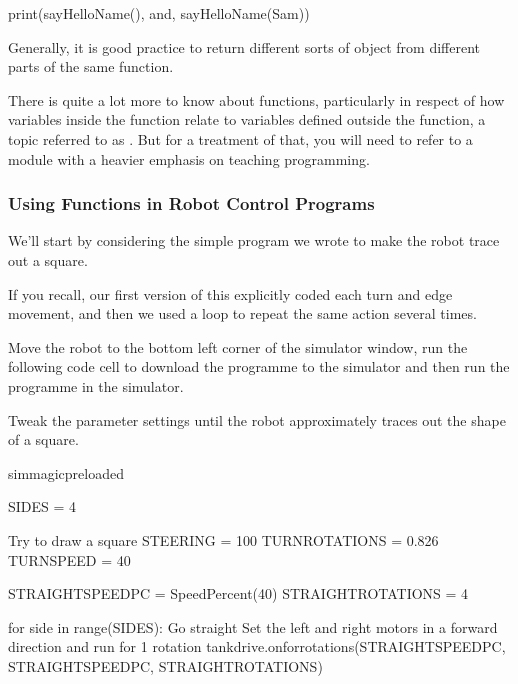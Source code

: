 \documentclass[letterpaper,10pt,english]{sphinxmanual}
\begin{document}
{{\begin{sphinxVerbatim}[commandchars=\\\{\}]
print(sayHelloName(), \PYGZsq{}and\PYGZsq{}, sayHelloName(\PYGZdq{}Sam\PYGZdq{}))
\end{sphinxVerbatim}
}

Generally, it is  good practice to return different sorts of object from different parts of the same function.

There is quite a lot more to know about functions, particularly in respect of how variables inside the function relate to variables defined outside the function, a topic referred to as . But for a treatment of that, you will need to refer to a module with a heavier emphasis on teaching programming.


\subsubsection{Using Functions in Robot Control Programs}
\label{\detokenize{content/03_Robot_Lab/Section_00_05:Using-Functions-in-Robot-Control-Programs}}
We’ll start by considering the simple program we wrote to make the robot trace out a square.

If you recall, our first version of this explicitly coded each turn and edge movement, and then we used a loop to repeat the same action several times.

Move the robot to the bottom left corner of the simulator window, run the following code cell to download the programme to the simulator and then run the programme in the simulator.

Tweak the parameter settings until the robot approximately traces out the shape of a square.

{
\begin{sphinxVerbatim}[commandchars=\\\{\}]
\llap{\color{nbsphinxin}[ ]:\,\hspace{\fboxrule}\hspace{\fboxsep}}\PYGZpc{}\PYGZpc{}sim\PYGZus{}magic\PYGZus{}preloaded

SIDES = 4

\PYGZsh{} Try to draw a square
STEERING = \PYGZhy{}100
TURN\PYGZus{}ROTATIONS = 0.826
TURN\PYGZus{}SPEED = 40

STRAIGHT\PYGZus{}SPEED\PYGZus{}PC = SpeedPercent(40)
STRAIGHT\PYGZus{}ROTATIONS = 4

for side in range(SIDES):
    \PYGZsh{}Go straight
    \PYGZsh{} Set the left and right motors in a forward direction
    \PYGZsh{} and run for 1 rotation
    tank\PYGZus{}drive.on\PYGZus{}for\PYGZus{}rotations(STRAIGHT\PYGZus{}SPEED\PYGZus{}PC,
                                STRAIGHT\PYGZus{}SPEED\PYGZus{}PC,
                                STRAIGHT\PYGZus{}ROTATIONS)


\end{sphinxVerbatim}}}
\end{document}
